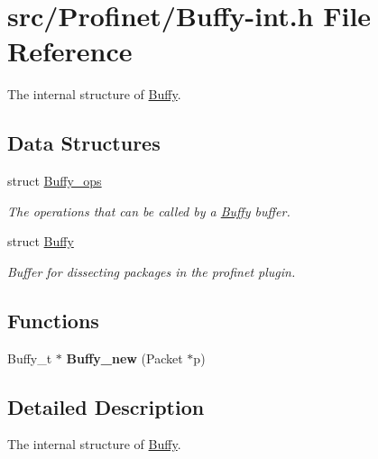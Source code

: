 \hypertarget{_buffy-int_8h}{}\section{src/\+Profinet/\+Buffy-\/int.h File Reference}
\label{_buffy-int_8h}


The internal structure of \hyperlink{struct_buffy}{Buffy}.  


\subsection*{Data Structures}
\begin{DoxyCompactItemize}
\item 
struct \hyperlink{struct_buffy__ops}{Buffy\+\_\+ops}
\begin{DoxyCompactList}\small\item\em The operations that can be called by a \hyperlink{struct_buffy}{Buffy} buffer. \end{DoxyCompactList}\item 
struct \hyperlink{struct_buffy}{Buffy}
\begin{DoxyCompactList}\small\item\em Buffer for dissecting packages in the profinet plugin. \end{DoxyCompactList}\end{DoxyCompactItemize}
\subsection*{Functions}
\begin{DoxyCompactItemize}
\item 
\hypertarget{_buffy-int_8h_a1274babfe9f124dab45c870ac6630496}{}Buffy\+\_\+t $\ast$ {\bfseries Buffy\+\_\+new} (Packet $\ast$p)\label{_buffy-int_8h_a1274babfe9f124dab45c870ac6630496}

\end{DoxyCompactItemize}


\subsection{Detailed Description}
The internal structure of \hyperlink{struct_buffy}{Buffy}. 

